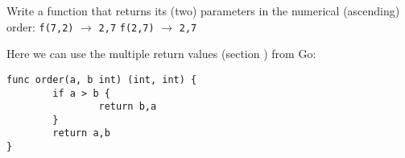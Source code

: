 \begin{Exercise}[title={Integer ordering},difficulty=0]
\label{ex:ordering function}
\Question Write a function that returns its (two) parameters in the
numerical (ascending) order:\newline 
\lstinline{f(7,2)} $\rightarrow$ \lstinline{2,7}\newline
\lstinline{f(2,7)} $\rightarrow$ \lstinline{2,7}\newline
\end{Exercise}

\begin{Answer}
\Question 
Here we can use the multiple return values (section )
from Go:
\begin{lstlisting}
func order(a, b int) (int, int) {
        if a > b { 
                return b,a 
        }   
        return a,b 
}
\end{lstlisting}

\end{Answer}
